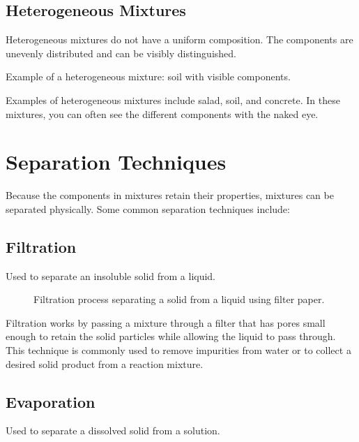 \subsection{Heterogeneous Mixtures}

Heterogeneous mixtures do not have a uniform composition. The components are unevenly distributed and can be visibly distinguished.

\begin{marginfigure}[0pt]
  \caption{Example of a heterogeneous mixture: soil with visible components.}
  \label{fig:heterogeneous}
\end{marginfigure}

Examples of heterogeneous mixtures include salad, soil, and concrete. In these mixtures, you can often see the different components with the naked eye.

\FloatBarrier %

\section{Separation Techniques}

Because the components in mixtures retain their properties, mixtures can be separated physically. Some common separation techniques include:

\subsection{Filtration}
Used to separate an insoluble solid from a liquid.

\begin{figure}[h]
  \caption{Filtration process separating a solid from a liquid using filter paper.}
  \label{fig:filtration}
\end{figure}

Filtration works by passing a mixture through a filter that has pores small enough to retain the solid particles while allowing the liquid to pass through. This technique is commonly used to remove impurities from water or to collect a desired solid product from a reaction mixture.

\subsection{Evaporation}
Used to separate a dissolved solid from a solution.

